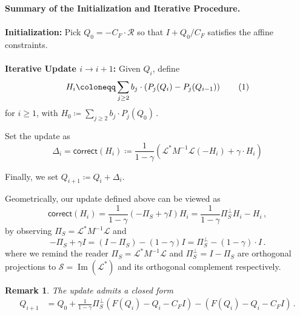 \documentclass[12pt]{article}
\def\1{\bm{1}}
\newtheorem{remark}[theorem]{Remark}
\newcommand{\calR}{\mathcal{R}}
\newcommand{\calS}{\mathcal{S}}
\newcommand\numberthis{\addtocounter{equation}{1}\tag{\theequation}}
\newcommand{\gam}{\gamma}
\newcommand{\corr}{\mathsf{correct}}
\newcommand{\calL}{\mathcal{L}}
\newcommand{\Authornote}[3]{{\sf\footnotesize\color{#3}{[#1: #2]}}}
\newcommand{\Authornote}[3]{}
\newcommand{\jnote}[1]{\Authornote{Jeff}{#1}{blue}}
\newcommand{\snote}[1]{\Authornote{Sofia}{#1}{orange}}
\begin{document}
\begin{mdframed}[linewidth=0.2pt]\textbf{Summary of the Initialization and Iterative Procedure.} 
\\\\
\textbf{Initialization:} Pick \(Q_0 = -C_F \cdot \calR\) so that \(I+Q_0/C_F\) satisfies the affine constraints.
\\\\
\textbf{Iterative Update $i\rightarrow i+1$:}
 Given \(Q_i\), 
  define \[ 
  H_{i} \coloneqq \sum_{j\ge 2} b_j \cdot \left(P_j(Q_{i}) - P_j(Q_{i-1})  \right) \numberthis \label{eq:primal-corr}
  \]
  for $i\ge 1$, with \( 
  H_{0} \coloneqq \sum_{j\ge 2} b_j \cdot P_j(Q_0)\,.
  \) 
  
  Set the update as 
  \[ 
  \Delta_{i}  = \corr(H_i) \coloneqq \frac{1}{1-\gamma} \left(\calL^*M^{-1} \calL(-H_{i} ) + \gam \cdot H_{i}     \right)
   \]
%  
 
 Finally, we set $Q_{i+1} \coloneqq Q_i+ \Delta_{i}$.
\end{mdframed}
%

	Geometrically, our update defined above can be viewed as \[ 
	\corr(H_i) =   \frac{1}{1-\gamma} (-\Pi_S +\gam I) H_i =  \frac{1}{1-\gamma} \Pi_S^\perp H_i - H_i \,,	\]
	by observing $ \Pi_S = \calL^*M^{-1} \calL  $ and  \[ 
	-\Pi_S + \gam I =   (I-\Pi_S)- (1-\gam )I = \Pi_S^\perp - (1-\gamma) \cdot  I\,.
	\]
	where we remind the reader $\Pi_S=\calL^*M^{-1}\calL$ and $\Pi_S^{\perp}=I-\Pi_S$ are orthogonal projections to $\calS = \operatorname{Im}(\mathcal L^*)$ and its orthogonal complement respectively. 

\begin{remark}
    The update admits a closed form
    \begin{align*}
        Q_{i+1} &= Q_0+\frac{1}{1-\gamma}\Pi_S^\perp(F(Q_i)-Q_i-C_FI)-(F(Q_i)-Q_i-C_FI)\,.
    \end{align*}
  \end{remark}
\jnote{i think your current version is correct but it might require a few lines of proof...add a proof to the appendix? its likely commented out below somewhere..}
\end{document}
